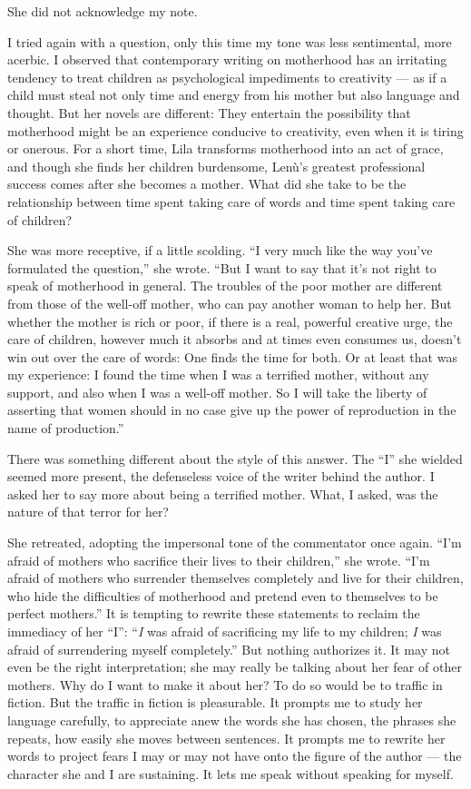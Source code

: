 She did not acknowledge my note.

I tried again with a question, only this time my tone was less
sentimental, more acerbic. I observed that contemporary writing on
motherhood has an irritating tendency to treat children as psychological
impediments to creativity --- as if a child must steal not only time and
energy from his mother but also language and thought. But her novels are
different: They entertain the possibility that motherhood might be an
experience conducive to creativity, even when it is tiring or onerous.
For a short time, Lila transforms motherhood into an act of grace, and
though she finds her children burdensome, Lenù's greatest professional
success comes after she becomes a mother. What did she take to be the
relationship between time spent taking care of words and time spent
taking care of children?

She was more receptive, if a little scolding. ``I very much like the way
you've formulated the question,'' she wrote. ``But I want to say that
it's not right to speak of motherhood in general. The troubles of the
poor mother are different from those of the well-off mother, who can pay
another woman to help her. But whether the mother is rich or poor, if
there is a real, powerful creative urge, the care of children, however
much it absorbs and at times even consumes us, doesn't win out over the
care of words: One finds the time for both. Or at least that was my
experience: I found the time when I was a terrified mother, without any
support, and also when I was a well-off mother. So I will take the
liberty of asserting that women should in no case give up the power of
reproduction in the name of production.''

There was something different about the style of this answer. The ``I''
she wielded seemed more present, the defenseless voice of the writer
behind the author. I asked her to say more about being a terrified
mother. What, I asked, was the nature of that terror for her?

She retreated, adopting the impersonal tone of the commentator once
again. ``I'm afraid of mothers who sacrifice their lives to their
children,'' she wrote. ``I'm afraid of mothers who surrender themselves
completely and live for their children, who hide the difficulties of
motherhood and pretend even to themselves to be perfect mothers.'' It is
tempting to rewrite these statements to reclaim the immediacy of her
``I'': ``\emph{I} was afraid of sacrificing my life to my children;
\emph{I} was afraid of surrendering myself completely.'' But nothing
authorizes it. It may not even be the right interpretation; she may
really be talking about her fear of other mothers. Why do I want to make
it about her? To do so would be to traffic in fiction. But the traffic
in fiction is pleasurable. It prompts me to study her language
carefully, to appreciate anew the words she has chosen, the phrases she
repeats, how easily she moves between sentences. It prompts me to
rewrite her words to project fears I may or may not have onto the figure
of the author --- the character she and I are sustaining. It lets me
speak without speaking for myself.

